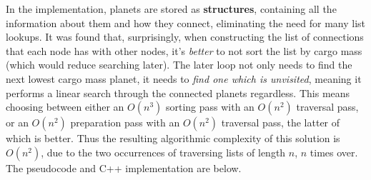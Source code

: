 \documentclass[
]{article}
\begin{document}
In the implementation, planets are stored as \textbf{structures},
containing all the information about them and how they connect,
eliminating the need for many list lookups. It was found that,
surprisingly, when constructing the list of connections that each node
has with other nodes, it's \emph{better} to not sort the list by cargo
mass (which would reduce searching later). The later loop not only needs
to find the next lowest cargo mass planet, it needs to \emph{find one
which is unvisited}, meaning it performs a linear search through the
connected planets regardless. This means choosing between either an
\(O(n^3)\) sorting pass with an \(O(n^2)\) traversal pass, or an
\(O(n^2)\) preparation pass with an \(O(n^2)\) traversal pass, the
latter of which is better. Thus the resulting algorithmic complexity of
this solution is \(O(n^2)\), due to the two occurrences of traversing
lists of length \(n\), \(n\) times over. The pseudocode and C++
implementation are below.
\end{document}
